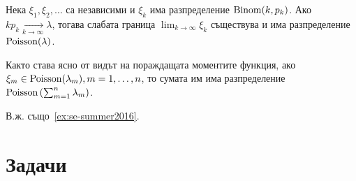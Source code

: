 \documentclass[numbers=endperiod, DIV=15, bibliography=totocnumbered]{scrartcl}
\begin{document}
\begin{theorem}[Поасон]\label{thm:poisson}
  Нека $\xi_1, \xi_2, \ldots$ са независими и $\xi_k$ има разпределение $\operatorname{Binom}(k, p_k)$. Ако $k p_k \underset {k \to \infty} \longrightarrow \lambda$, тогава слабата граница $\lim_{k \to \infty} \xi_k$ съществува и има разпределение $\operatorname{Poisson}(\lambda)$.
\end{theorem}

Както става ясно от видът на пораждащата моментите функция, ако $\xi_m \in \operatorname{Poisson}(\lambda_m), m = 1, \ldots, n$, то сумата им има разпределение $\operatorname{Poisson}\left(\sum_{m=1}^n \lambda_m \right)$.

В.ж. също~\ref{ex:se-summer2016}.

\section{Задачи}
\end{document}
